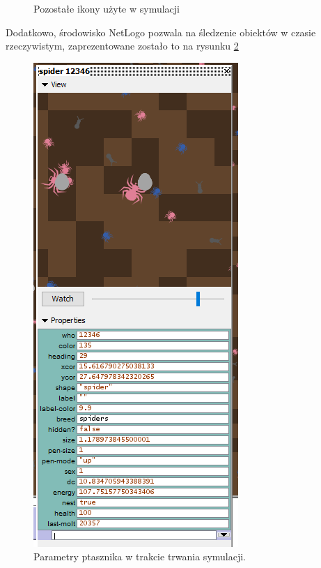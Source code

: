 \documentclass[a4paper,11pt,titlepage]{article}
\begin{document}
\begin{figure}[H]%
    \centering
    \qquad
    \caption{Pozostałe ikony użyte w symulacji}%
    \label{fig:icons2}%
\end{figure}

Dodatkowo, środowisko NetLogo pozwala na śledzenie obiektów w czasie rzeczywistym, zaprezentowane zostało to na rysunku \ref{fig:8}

\begin{figure}[H]
\centering
\includegraphics[width=.5\columnwidth]{img/spider-params.PNG}
\caption{Parametry ptasznika w trakcie trwania symulacji.}
\label{fig:8}
\end{figure}
\end{document}
